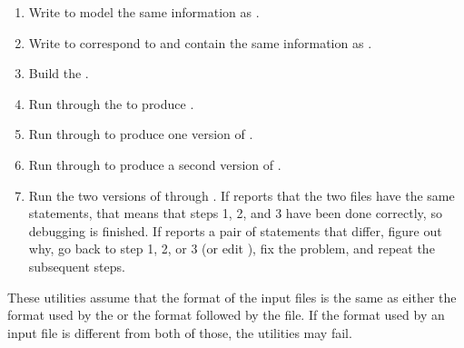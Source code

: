 \begin{enumerate}
\item Write  to model the same information as .

\item Write  to correspond to  and contain the
same information as .

\item Build the .

\item Run  through the  to produce
.

\item Run  through  to produce
one version of .

\item Run  through  to produce
a second version of .

\item Run the two versions of  through
. If  reports that the two files have the same
statements, that means that steps 1, 2, and 3 have been done correctly, so
debugging is finished. If  reports a pair of statements that
differ, figure out why, go back to step 1, 2, or 3 (or edit
), fix the problem, and repeat the subsequent steps.
\end{enumerate}

These utilities assume that the format of the input files is the same
as either the format used by the  or the format followed by
the  file. If the format used by an input file is
different from both of those, the utilities may fail.


